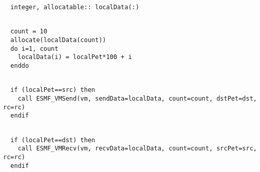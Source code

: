  \begin{verbatim}
  integer, allocatable:: localData(:)
 
\end{verbatim}
 

 \begin{verbatim}
  count = 10
  allocate(localData(count))
  do i=1, count
    localData(i) = localPet*100 + i
  enddo
 
\end{verbatim}
 

 \begin{verbatim}
  if (localPet==src) then
    call ESMF_VMSend(vm, sendData=localData, count=count, dstPet=dst, rc=rc)
  endif
 
\end{verbatim}
 

 \begin{verbatim}
  if (localPet==dst) then
    call ESMF_VMRecv(vm, recvData=localData, count=count, srcPet=src, rc=rc)
  endif
 
\end{verbatim}

\setlength{\parskip}{\oldparskip}
\setlength{\parindent}{\oldparindent}
\setlength{\baselineskip}{\oldbaselineskip}

